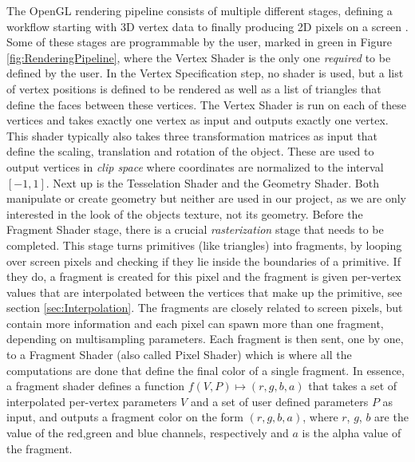 The OpenGL rendering pipeline consists of multiple different stages, defining a workflow starting with 3D vertex data to finally producing 2D pixels on a screen \cite{a2019_rendering}. Some of these stages are programmable by the user, marked in green in Figure \ref{fig:RenderingPipeline}, where the Vertex Shader is the only one \textit{required} to be defined by the user. In the Vertex Specification step, no shader is used, but a list of vertex positions is defined to be rendered as well as a list of triangles that define the faces between these vertices. The Vertex Shader is run on each of these vertices and takes exactly one vertex as input and outputs exactly one vertex. This shader typically also takes three transformation matrices as input that define the scaling, translation and rotation of the object. These are used to output vertices in \textit{clip space} where coordinates are normalized to the interval $[-1,1]$. Next up is the Tesselation Shader and the Geometry Shader. Both manipulate or create geometry but neither are used in our project, as we are only interested in the look of the objects texture, not its geometry. Before the Fragment Shader stage, there is a crucial \textit{rasterization} stage that needs to be completed. This stage turns primitives (like triangles) into fragments, by looping over screen pixels and checking if they lie inside the boundaries of a primitive. If they do, a fragment is created for this pixel and the fragment is given per-vertex values that are interpolated between the vertices that make up the primitive, see section \ref{sec:Interpolation}. The fragments are closely related to screen pixels, but contain more information and each pixel can spawn more than one fragment, depending on multisampling parameters. Each fragment is then sent, one by one, to a Fragment Shader (also called Pixel Shader) which is where all the computations are done that define the final color of a single fragment. In essence, a fragment shader defines a function $f(V,P) \mapsto (r,g,b,a)$ that takes a set of interpolated per-vertex parameters $V$ and a set of user defined parameters $P$ as input, and outputs a fragment color on the form $(r,g,b,a)$, where $r$, $g$, $b$ are the value of the red,green and blue channels, respectively and $a$ is the alpha value of the fragment.


